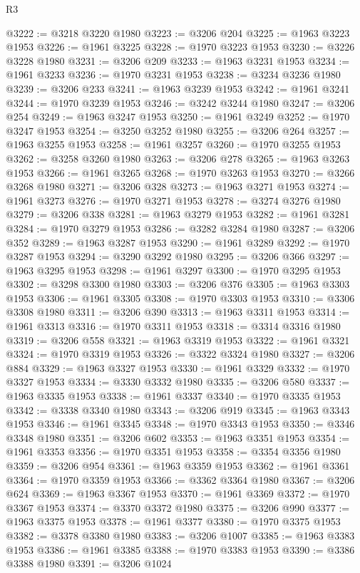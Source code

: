 \begin{lexlean}{R3}
\begin{coremodule}
@3222 := @3218 @3220 @1980
@3223 := @3206 @204
@3225 := @1963 @3223 @1953
@3226 := @1961 @3225
@3228 := @1970 @3223 @1953
@3230 := @3226 @3228 @1980
@3231 := @3206 @209
@3233 := @1963 @3231 @1953
@3234 := @1961 @3233
@3236 := @1970 @3231 @1953
@3238 := @3234 @3236 @1980
@3239 := @3206 @233
@3241 := @1963 @3239 @1953
@3242 := @1961 @3241
@3244 := @1970 @3239 @1953
@3246 := @3242 @3244 @1980
@3247 := @3206 @254
@3249 := @1963 @3247 @1953
@3250 := @1961 @3249
@3252 := @1970 @3247 @1953
@3254 := @3250 @3252 @1980
@3255 := @3206 @264
@3257 := @1963 @3255 @1953
@3258 := @1961 @3257
@3260 := @1970 @3255 @1953
@3262 := @3258 @3260 @1980
@3263 := @3206 @278
@3265 := @1963 @3263 @1953
@3266 := @1961 @3265
@3268 := @1970 @3263 @1953
@3270 := @3266 @3268 @1980
@3271 := @3206 @328
@3273 := @1963 @3271 @1953
@3274 := @1961 @3273
@3276 := @1970 @3271 @1953
@3278 := @3274 @3276 @1980
@3279 := @3206 @338
@3281 := @1963 @3279 @1953
@3282 := @1961 @3281
@3284 := @1970 @3279 @1953
@3286 := @3282 @3284 @1980
@3287 := @3206 @352
@3289 := @1963 @3287 @1953
@3290 := @1961 @3289
@3292 := @1970 @3287 @1953
@3294 := @3290 @3292 @1980
@3295 := @3206 @366
@3297 := @1963 @3295 @1953
@3298 := @1961 @3297
@3300 := @1970 @3295 @1953
@3302 := @3298 @3300 @1980
@3303 := @3206 @376
@3305 := @1963 @3303 @1953
@3306 := @1961 @3305
@3308 := @1970 @3303 @1953
@3310 := @3306 @3308 @1980
@3311 := @3206 @390
@3313 := @1963 @3311 @1953
@3314 := @1961 @3313
@3316 := @1970 @3311 @1953
@3318 := @3314 @3316 @1980
@3319 := @3206 @558
@3321 := @1963 @3319 @1953
@3322 := @1961 @3321
@3324 := @1970 @3319 @1953
@3326 := @3322 @3324 @1980
@3327 := @3206 @884
@3329 := @1963 @3327 @1953
@3330 := @1961 @3329
@3332 := @1970 @3327 @1953
@3334 := @3330 @3332 @1980
@3335 := @3206 @580
@3337 := @1963 @3335 @1953
@3338 := @1961 @3337
@3340 := @1970 @3335 @1953
@3342 := @3338 @3340 @1980
@3343 := @3206 @919
@3345 := @1963 @3343 @1953
@3346 := @1961 @3345
@3348 := @1970 @3343 @1953
@3350 := @3346 @3348 @1980
@3351 := @3206 @602
@3353 := @1963 @3351 @1953
@3354 := @1961 @3353
@3356 := @1970 @3351 @1953
@3358 := @3354 @3356 @1980
@3359 := @3206 @954
@3361 := @1963 @3359 @1953
@3362 := @1961 @3361
@3364 := @1970 @3359 @1953
@3366 := @3362 @3364 @1980
@3367 := @3206 @624
@3369 := @1963 @3367 @1953
@3370 := @1961 @3369
@3372 := @1970 @3367 @1953
@3374 := @3370 @3372 @1980
@3375 := @3206 @990
@3377 := @1963 @3375 @1953
@3378 := @1961 @3377
@3380 := @1970 @3375 @1953
@3382 := @3378 @3380 @1980
@3383 := @3206 @1007
@3385 := @1963 @3383 @1953
@3386 := @1961 @3385
@3388 := @1970 @3383 @1953
@3390 := @3386 @3388 @1980
@3391 := @3206 @1024

\end{coremodule}
\end{lexlean}
